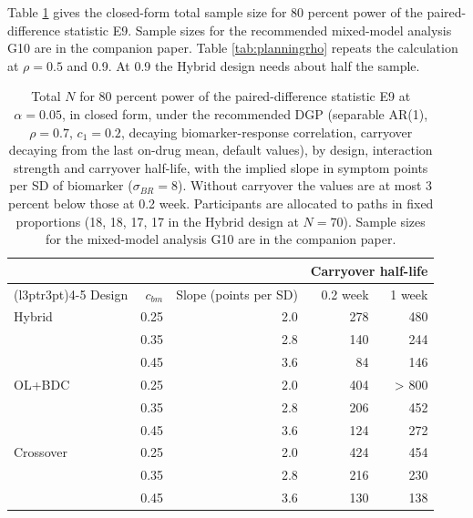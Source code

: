 \documentclass[
  11pt,
]{article}
\begin{document}
Table \ref{tab:planning} gives the closed-form total sample size for
80 percent power of the paired-difference statistic E9. Sample sizes
for the recommended mixed-model analysis G10 are in the companion
paper. Table \ref{tab:planningrho} repeats the calculation at
\(\rho = 0.5\) and 0.9. At 0.9 the Hybrid design needs about half the
sample.

\begin{table}

\caption{\label{tab:planning}Total $N$ for 80 percent power of the paired-difference statistic E9 at $\alpha = 0.05$, in closed form, under the recommended DGP (separable AR(1), $\rho = 0.7$, $c_1 = 0.2$, decaying biomarker-response correlation, carryover decaying from the last on-drug mean, default values), by design, interaction strength and carryover half-life, with the implied slope in symptom points per SD of biomarker ($\sigma_{BR} = 8$). Without carryover the values are at most 3 percent below those at 0.2 week. Participants are allocated to paths in fixed proportions (18, 18, 17, 17 in the Hybrid design at $N = 70$). Sample sizes for the mixed-model analysis G10 are in the companion paper.}
\centering
\begin{tabular}[t]{lrrrr}
\toprule
\multicolumn{3}{c}{ } & \multicolumn{2}{c}{Carryover half-life} \\
\cmidrule(l{3pt}r{3pt}){4-5}
Design & $c_{bm}$ & Slope (points per SD) & 0.2 week & 1 week\\
\midrule
Hybrid & 0.25 & 2.0 & 278 & 480\\
 & 0.35 & 2.8 & 140 & 244\\
 & 0.45 & 3.6 & 84 & 146\\
OL+BDC & 0.25 & 2.0 & 404 & > 800\\
 & 0.35 & 2.8 & 206 & 452\\
 & 0.45 & 3.6 & 124 & 272\\
Crossover & 0.25 & 2.0 & 424 & 454\\
 & 0.35 & 2.8 & 216 & 230\\
 & 0.45 & 3.6 & 130 & 138\\
\bottomrule
\end{tabular}
\end{table}
\end{document}
